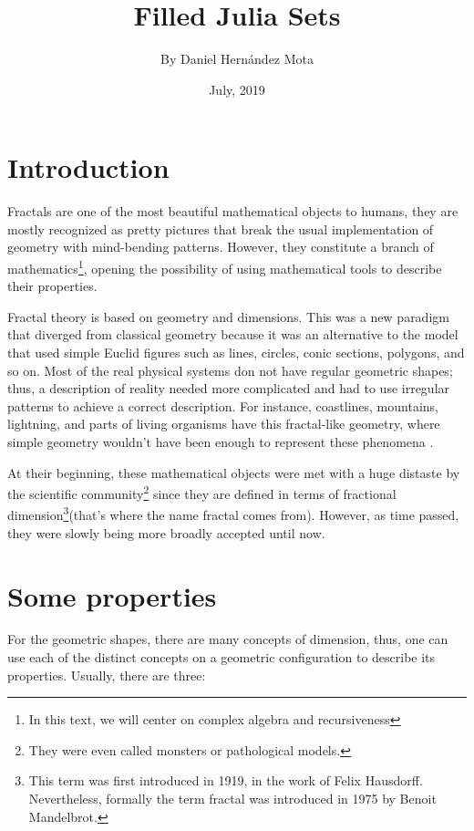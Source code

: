 \documentclass{article}
\title{Filled Julia Sets}
\author{By Daniel Hernández Mota}
\date{July, 2019}
\begin{document}
\maketitle

\section{Introduction}

Fractals are one of the most beautiful mathematical objects to humans, they are mostly recognized as pretty pictures that break the usual implementation of geometry with mind-bending patterns. However, they constitute a branch of mathematics\footnote{In this text, we will center on complex algebra and recursiveness}, opening the possibility of using mathematical tools to describe their properties\cite{Edyta}. 

Fractal theory is based on geometry and dimensions. This was a new paradigm that diverged from classical geometry because it was an alternative to the model that used simple Euclid figures such as lines, circles, conic sections, polygons, and so on. Most of the real physical systems don not have regular geometric shapes; thus, a description of reality needed more complicated and had to use irregular patterns to achieve a correct description\cite{Crownover}. For instance, coastlines, mountains, lightning, and parts of living organisms have this fractal-like geometry, where simple geometry wouldn't have been enough to represent these phenomena \cite{Edyta}.

At their beginning, these mathematical objects were met with a huge distaste by the scientific community\footnote{They were even called monsters or pathological models.} since they are defined in terms of fractional dimension\footnote{This term was first introduced in 1919, in the work of Felix Hausdorff. Nevertheless, formally the term fractal was introduced in 1975 by Benoit Mandelbrot.}(that's where the name fractal comes from). However, as time passed, they were slowly being more broadly accepted until now. 
\newpage
\section{Some properties}
For the geometric shapes, there are many concepts of dimension, thus, one can use each of the distinct concepts on a geometric configuration to describe its properties. Usually, there are three\cite{Crownover}:
\end{document}
